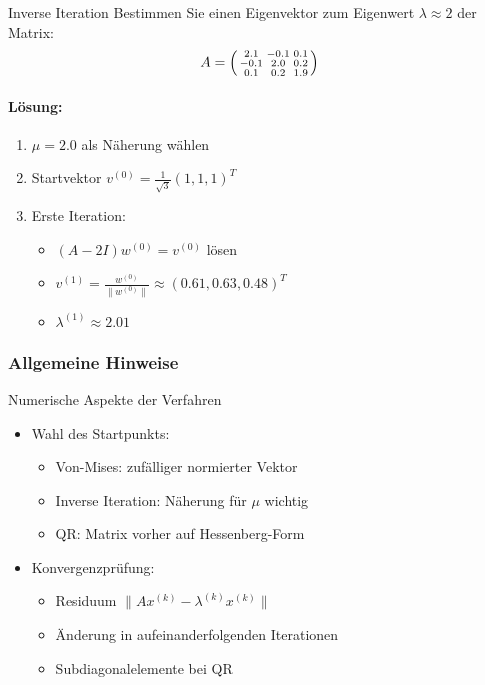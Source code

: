 \begin{example2}{Inverse Iteration}
Bestimmen Sie einen Eigenvektor zum Eigenwert $\lambda \approx 2$ der Matrix:
$$A = \begin{psmallmatrix}
2.1 & -0.1 & 0.1 \\
-0.1 & 2.0 & 0.2 \\
0.1 & 0.2 & 1.9
\end{psmallmatrix}$$

\paragraph{Lösung:}
\begin{enumerate}
    \item $\mu = 2.0$ als Näherung wählen
    \item Startvektor $v^{(0)} = \frac{1}{\sqrt{3}}(1,1,1)^T$
    \item Erste Iteration:
    \begin{itemize}
        \item $(A-2I)w^{(0)} = v^{(0)}$ lösen
        \item $v^{(1)} = \frac{w^{(0)}}{\|w^{(0)}\|} \approx (0.61, 0.63, 0.48)^T$
        \item $\lambda^{(1)} \approx 2.01$
    \end{itemize}
\end{enumerate}
\end{example2}

\subsubsection{Allgemeine Hinweise}

\begin{corollary}{Numerische Aspekte der Verfahren}
\begin{itemize}
    \item Wahl des Startpunkts:
    \begin{itemize}
        \item Von-Mises: zufälliger normierter Vektor
        \item Inverse Iteration: Näherung für $\mu$ wichtig
        \item QR: Matrix vorher auf Hessenberg-Form
    \end{itemize}
    
    \item Konvergenzprüfung:
    \begin{itemize}
        \item Residuum $\|Ax^{(k)} - \lambda^{(k)}x^{(k)}\|$
        \item Änderung in aufeinanderfolgenden Iterationen
        \item Subdiagonalelemente bei QR
    \end{itemize}
\end{itemize}
\end{corollary}

